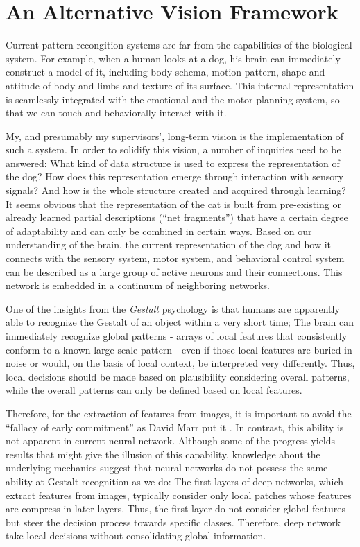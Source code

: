 

\section{An Alternative Vision Framework}
Current pattern recongition systems are far from the capabilities of the biological system.
For example, when a human looks at a dog, his brain can immediately construct a model of it, 
including body schema, motion pattern, shape and attitude of body and limbs and texture of its surface.  
This internal representation is seamlessly integrated with the emotional and the motor-planning system, so that we can touch and behaviorally interact with it.

My, and presumably my supervisors', long-term vision is the implementation of such a system. In order to solidify this vision, a number of inquiries need to be answered: What kind of data structure is used to express the representation of the dog? How does this representation emerge through interaction with sensory signals? And how is the whole structure created and acquired through learning? It seems obvious that the representation of the cat is built from pre-existing or already learned partial descriptions (``net fragments'') that have a certain degree of adaptability and can only be combined in certain ways.
Based on our understanding of the brain, the current representation of the dog and how it connects with the sensory system, motor system, and behavioral control system can be described as a large group of active neurons and their connections. This network is embedded in a continuum of neighboring networks.

One of the insights from the \emph{Gestalt} psychology is that humans are apparently able to recognize the Gestalt of an object within a very short time; The brain can immediately recognize global patterns - arrays of local features that consistently conform to a known large-scale pattern - even if those local features are buried in noise or would, on the basis of local context, be interpreted very differently. Thus, local decisions should be made based on plausibility considering overall patterns, while the overall patterns can only be defined based on local features.

Therefore, for the extraction of features from images, it is important to avoid the ``fallacy of early commitment'' as David Marr put it . In contrast, this ability is not apparent in current neural network. Although some of the progress yields results that might give the illusion of this capability, knowledge about the underlying mechanics suggest that neural networks do not possess the same ability at Gestalt recognition as we do: The first layers of deep networks, which extract features from images, typically consider only local patches whose features are compress in later layers. Thus, the first layer do not consider global features but steer the decision process towards specific classes. Therefore, deep network take local decisions without consolidating global information.

